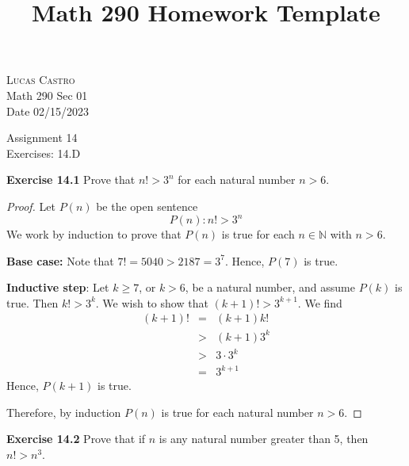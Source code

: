 \documentclass[12pt,oneside]{article}
\newenvironment{exercise}[1]{\vspace{.1in}\noindent\textbf{Exercise #1 \hspace{.05em}}}{}
\newcommand{\N}{\mathbb{N}}
\begin{document}
\title{Math 290 Homework Template}

\begin{flushright}
\textsc{Lucas Castro}  \\
Math 290 Sec 01\\
Date 02/15/2023
\end{flushright}

\begin{center}
\textsf{Assignment 14} \\
\textsf{Exercises: 14.D}
\end{center}


\begin{exercise}{14.1}
Prove that $n! > 3^n$ for each natural number $n > 6$.
\end{exercise}

\begin{proof}
Let $P(n)$ be the open sentence
\[P(n): n! > 3^n\]
We work by induction to prove that $P(n)$ is true for each $n \in \N$ with $n > 6$.

\textbf{Base case:} Note that $7! = 5040 > 2187 = 3^7$. Hence, $P(7)$ is true.

\textbf{Inductive step}: Let $k \geq 7$, or $k > 6$, be a natural number, and assume $P(k)$ is true. Then $k! > 3^k$. We wish to show that $(k+1)! > 3^{k+1}$. We find
\begin{eqnarray*}
(k+1)! &=& (k+1)k! \\
&>& (k+1)3^k \\
&>& 3\cdot3^k \\
&=& 3^{k+1}
\end{eqnarray*}
Hence, $P(k+1)$ is true.

Therefore, by induction $P(n)$ is true for each natural number $n > 6$.
\end{proof}



\begin{exercise}{14.2}
Prove that if $n$ is any natural number greater than 5, then $n! > n^3$.
\end{exercise}
\end{document}
